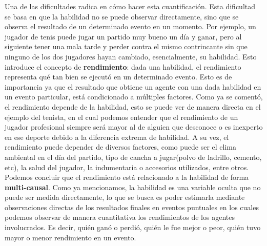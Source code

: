 \documentclass[11pt,twoside,spanish]{report} %
\begin{document}
Una de las dificultades radica en c\'omo hacer esta cuantificaci\'on.
Esta dificultad se basa en que la habilidad no se puede observar directamente, sino que se observa el resultado de un determinado evento en un momento.
Por ejemplo, un jugador de tenis puede jugar un partido muy bueno un d\'ia y ganar, pero al siguiente tener una mala tarde y perder contra el mismo contrincante sin que ninguno de los dos jugadores hayan cambiado, esencialmente, su habilidad.
Esto introduce el concepto de \textbf{rendimiento}: dada una habilidad, el rendimiento representa qu\'e tan bien se ejecut\'o en un determinado evento.
Esto es de importancia ya que el resultado que obtiene un agente con una dada habilidad en un evento particular, est\'a condicionado a m\'ultiples factores.
Como ya se coment\'o, el rendimiento depende de la habilidad, esto se puede ver de manera directa en el ejemplo del tenista, en el cual podemos entender que el rendimiento de un jugador profesional siempre ser\'a mayor al de alguien que desconoce o es inexperto en ese deporte debido a la diferencia extrema de habilidad.
A su vez, el rendimiento puede depender de diversos factores, como puede ser el clima ambiental en el d\'ia del partido, tipo de cancha a jugar(polvo de ladrillo, cemento, etc), la salud del jugador, la indumentaria o accesorios utilizados, entre otros.
Podemos concluir que el rendimiento est\'a relacionado a la habilidad de forma \textbf{multi-causal}.
Como ya mencionamos, la habilidad es una variable oculta que no puede ser medida directamente, lo que se busca es poder estimarla mediante observaciones directas de los resultados finales en eventos puntuales en los cuales podemos observar de manera cuantitativa los rendimientos de los agentes involucrados.
Es decir, qui\'en gan\'o o perdi\'o, qui\'en le fue mejor o peor, qui\'en tuvo mayor o menor rendimiento en un evento.
\end{document}

